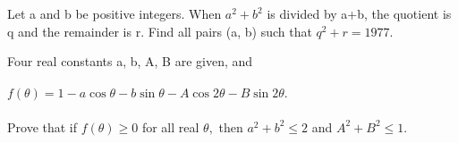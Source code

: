 

\item Let a and b be positive integers. When $a^2+b^2$ is divided by a+b, the quotient
is q and the remainder is r. Find all pairs (a, b) such that $q^2 + r = 1977.$\\

\item Four real constants a, b, A, B are given, and\\
\\$f(\theta) = 1 - a \cos\theta  - b \sin\theta - A \cos 2\theta - B \sin 2\theta.$\\
\\Prove that if $f(\theta) \geq 0$ for all real $\theta,$ then $a^2 + b^2 \leq 2$ and $A^2 + B^2 \leq 1.$


